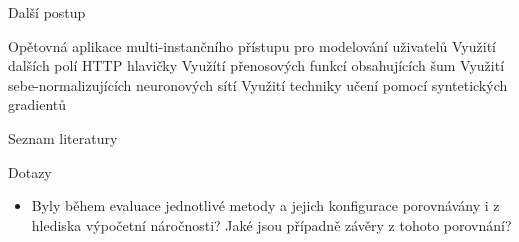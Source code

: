 \documentclass[10pt]{beamer}
\begin{document}
\begin{frame}{Další postup}
	\begin{enumerate}
		\ballotitem Opětovná aplikace multi-instančního přístupu pro modelování uživatelů
		\ballotitem Využití dalších polí HTTP hlavičky
		\ballotitem Využítí přenosových funkcí obsahujících šum
		\ballotitem Využití sebe-normalizujících neuronových sítí
		\ballotitem Využití techniky učení pomocí syntetických gradientů
	\end{enumerate}
\end{frame}

\begin{frame}{Seznam literatury}
	\printbibliography
\end{frame}

\begin{frame}{Dotazy}
	\begin{itemize}
		\item Byly během evaluace jednotlivé metody a jejich konfigurace porovnávány i z hlediska výpočetní náročnosti? Jaké jsou případně závěry z tohoto porovnání?
	\end{itemize}
\end{frame}
\end{document}
